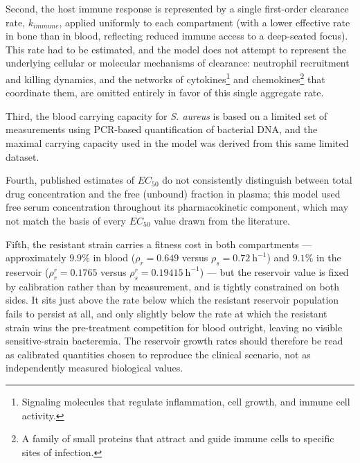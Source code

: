 \documentclass[12pt, draftcls, onecolumn]{IEEEtran}
\begin{document}
Second, the host immune response is represented by a single first-order
clearance rate, $k_{immune}$, applied uniformly to each compartment (with
a lower effective rate in bone than in blood, reflecting reduced immune
access to a deep-seated focus). This rate had to be estimated, and the
model does not attempt to represent the underlying cellular or molecular
mechanisms of clearance: neutrophil recruitment and killing dynamics, and
the networks of cytokines\footnote{Signaling molecules that regulate
inflammation, cell growth, and immune cell activity.} and
chemokines\footnote{A family of small proteins that attract and guide
immune cells to specific sites of infection.} that coordinate them, are
omitted entirely in favor of this single aggregate rate.

Third, the blood carrying capacity for \textit{S. aureus} is based on a
limited set of measurements using PCR-based quantification of bacterial
DNA, and the maximal carrying capacity used in the model was derived from
this same limited dataset.

Fourth, published estimates of $EC_{50}$ do not consistently distinguish
between total drug concentration and the free (unbound) fraction in
plasma; this model used free serum concentration throughout its
pharmacokinetic component, which may not match the basis of every $EC_{50}$
value drawn from the literature.

Fifth, the resistant strain carries a fitness cost in both compartments
--- approximately $9.9\%$ in blood ($\rho_r = 0.649$ versus
$\rho_s = 0.72~\mathrm{h}^{-1}$) and $9.1\%$ in the reservoir
($\rho_r^r = 0.1765$ versus $\rho_s^r = 0.19415~\mathrm{h}^{-1}$) --- but
the reservoir value is fixed by calibration rather than by measurement,
and is tightly constrained on both sides. It sits just above the rate
below which the resistant reservoir population fails to persist at all,
and only slightly below the rate at which the resistant strain wins the
pre-treatment competition for blood outright, leaving no visible
sensitive-strain bacteremia. The reservoir growth rates should therefore
be read as calibrated quantities chosen to reproduce the clinical
scenario, not as independently measured biological values.
\end{document}
